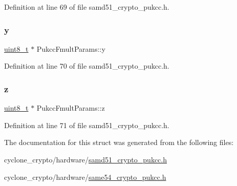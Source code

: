 Definition at line 69 of file samd51\+\_\+crypto\+\_\+pukcc.\+h.

\mbox{\label{structPukccFmultParams_ac5deea5a9a5fe96802a833f340417bf7}} 
\subsubsection{\texorpdfstring{y}{y}}
{\footnotesize\ttfamily \hyperlink{stdint_8h_aba7bc1797add20fe3efdf37ced1182c5}{uint8\+\_\+t} $\ast$ Pukcc\+Fmult\+Params\+::y}



Definition at line 70 of file samd51\+\_\+crypto\+\_\+pukcc.\+h.

\mbox{\label{structPukccFmultParams_a9bbf57b29b0c6f8ee0d24b6e1d4cd150}} 
\subsubsection{\texorpdfstring{z}{z}}
{\footnotesize\ttfamily \hyperlink{stdint_8h_aba7bc1797add20fe3efdf37ced1182c5}{uint8\+\_\+t} $\ast$ Pukcc\+Fmult\+Params\+::z}



Definition at line 71 of file samd51\+\_\+crypto\+\_\+pukcc.\+h.



The documentation for this struct was generated from the following files\+:\begin{DoxyCompactItemize}
\item 
cyclone\+\_\+crypto/hardware/\hyperlink{samd51__crypto__pukcc_8h}{samd51\+\_\+crypto\+\_\+pukcc.\+h}\item 
cyclone\+\_\+crypto/hardware/\hyperlink{same54__crypto__pukcc_8h}{same54\+\_\+crypto\+\_\+pukcc.\+h}\end{DoxyCompactItemize}
